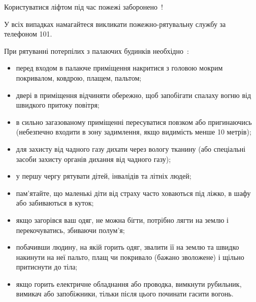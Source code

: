 Користуватися ліфтом під час пожежі заборонено~\cite{iFrank}!

У всіх випадках намагайтеся викликати пожежно-рятувальну
службу за телефоном 101.

При рятуванні потерпілих з палаючих будинків необхідно~\cite{iFrank}:
\begin{itemize}
	\item перед входом в палаюче приміщення накритися з головою мокрим покривалом, ковдрою, плащем, пальтом;
	\item двері в приміщення відчиняти обережно, щоб запобігати спалаху вогню від швидкого притоку повітря;
	\item в сильно загазованому приміщенні пересуватися повзком або пригинаючись (небезпечно входити в зону задимлення, якщо видимість менше 10 метрів);
	\item для захисту від чадного газу дихати через вологу тканину (або спеціальні засоби захисту органів дихання від чадного газу);
	\item у першу чергу рятувати дітей, інвалідів та літніх людей;
	\item пам’ятайте, що маленькі діти від страху часто ховаються під ліжко, в шафу або забиваються в куток;
	\item якщо загорівся ваш одяг, не можна бігти, потрібно лягти на землю і перекочуватись, збиваючи полум’я;
	\item побачивши людину, на якій горить одяг, звалити її на землю та швидко накинути на неї пальто, плащ чи покривало (бажано зволожене) і щільно притиснути до тіла;
	\item якщо горить електричне обладнання або проводка, вимкнути рубильник, вимикач або запобіжники, тільки після цього починати гасити вогонь.
\end{itemize}

